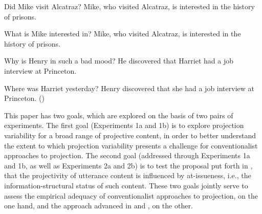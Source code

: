 \documentclass[11pt,fleqn]{article}
\newcommand{\6}{\mbox{$[\hspace*{-.6mm}[$}}
\newcommand{\9}{\mbox{$]\hspace*{-.6mm}]$}}
\def\infelic{{\leavevmode\llap{\#}}}
\begin{document}
\begin{exe}
\ex\label{nrrc}
\begin{xlist}
\ex
\begin{xlist}
 Did Mike visit Alcatraz?
 \infelic Mike, who visited Alcatraz, is interested in the history of prisons.
\end{xlist}


\ex
\begin{xlist}
 What is Mike interested in?
 Mike, who visited Alcatraz, is interested in the history of prisons.
\end{xlist}


\end{xlist}

\ex\label{discover}
\begin{xlist}

\ex
\begin{xlist}
 Why is Henry in such a bad mood?
 He discovered that Harriet had a job interview at Princeton. 
\end{xlist}

\ex
\begin{xlist}
 Where was Harriet yesterday?
 Henry discovered that she had a job interview at Princeton. \hfill (\citealt[1035]{simons07})
\end{xlist}
\end{xlist}
\end{exe}

This paper has two goals, which are explored on the basis of two pairs of experiments. The first goal (Experiments 1a and 1b) is to explore projection variability for a broad range of projective content, in order to better understand the extent to which projection variability presents a challenge for conventionalist approaches to projection. The second goal (addressed through Experiments 1a and 1b, as well as Experiments 2a and 2b) is to test the proposal put forth in \citealt{brst-salt10}, that the projectivity of utterance content is influenced by at-issueness, i.e., the information-structural status of such content. These two goals jointly serve to assess the empirical adequacy of conventionalist approaches to projection, on the one hand, and the approach advanced in  \citealt{brst-salt10} and \citealt{brst-ar}, on the other.
\end{document}
